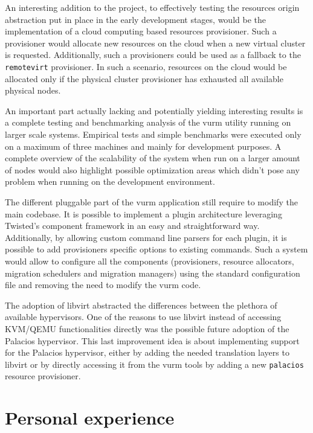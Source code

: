 An interesting addition to the project, to effectively testing the resources origin abstraction put in place in the early development stages, would be the implementation of a cloud computing based resources provisioner. Such a provisioner would allocate new resources on the cloud when a new virtual cluster is requested. Additionally, such a provisioners could be used as a fallback to the \texttt{remotevirt} provisioner. In such a scenario, resources on the cloud would be allocated only if the physical cluster provisioner has exhausted all available physical nodes.

An important part actually lacking and potentially yielding interesting results is a complete testing and benchmarking analysis of the \gls{vurm} utility running on larger scale systems. Empirical tests and simple benchmarks were executed only on a maximum of three machines and mainly for development purposes. A complete overview of the scalability of the system when run on a larger amount of nodes would also highlight possible optimization areas which didn't pose any problem when running on the development environment.

The different pluggable part of the \gls{vurm} application still require to modify the main codebase. It is possible to implement a plugin architecture leveraging Twisted's component framework in an easy and straightforward way. Additionally, by allowing custom command line parsers for each plugin, it is possible to add provisioners specific options to existing commands. Such a system would allow to configure all the components (provisioners, resource allocators, migration schedulers and migration managers) using the standard configuration file and removing the need to modify the \gls{vurm} code.

The adoption of libvirt abstracted the differences between the plethora of available hypervisors. One of the reasons to use libvirt instead of accessing KVM/QEMU functionalities directly was the possible future adoption of the Palacios hypervisor. This last improvement idea is about implementing support for the Palacios hypervisor, either by adding the needed translation layers to libvirt or by directly accessing it from the \gls{vurm} tools by adding a new \texttt{palacios} resource provisioner.


\section{Personal experience}
\label{sec:experience}

